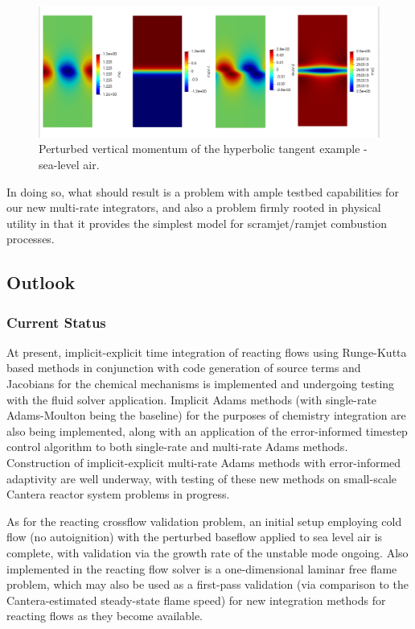 \begin{figure}
\centering
\includegraphics[width=0.9\linewidth,trim=4 4 4 4,clip]{figures/hyperbolic_tangent_air.png}
\caption{Perturbed vertical momentum of the hyperbolic tangent example - sea-level air.}
\label{fig:hyperbolic_cold_rhov2}
\end{figure}

In doing so, what should result is a problem with ample testbed capabilities for our
new multi-rate integrators, and also a problem firmly rooted in physical utility in that
it provides the simplest model for scramjet/ramjet combustion processes.

\subsection{Outlook}

\subsubsection{Current Status}

At present, implicit-explicit time integration of reacting flows using Runge-Kutta
based methods in conjunction with code generation of source terms and Jacobians for
the chemical mechanisms is implemented and undergoing testing with the fluid solver
application. Implicit Adams methods (with single-rate Adams-Moulton being the baseline)
for the purposes of chemistry integration are also being implemented, along with
an application of the error-informed timestep control algorithm to both
single-rate and multi-rate Adams methods. Construction of implicit-explicit multi-rate
Adams methods with error-informed adaptivity are well underway, with testing
of these new methods on small-scale Cantera reactor system problems in progress.

As for the reacting crossflow validation problem, an initial setup employing
cold flow (no autoignition) with the perturbed baseflow applied to sea level air
is complete, with validation via the growth rate of the unstable mode ongoing.
Also implemented in the reacting flow solver is a one-dimensional
laminar free flame problem, which may also be used as a first-pass validation (via
comparison to the Cantera-estimated steady-state flame speed) for new integration
methods for reacting flows as they become available.


